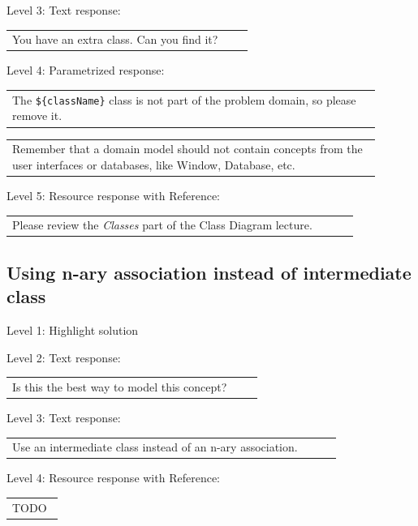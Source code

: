 \noindent Level 3: Text response: \medskip

\begin{tabular}{|p{0.9\linewidth}}
You have an extra class. Can you find it?
\end{tabular} \medskip

\noindent Level 4: Parametrized response: \medskip

\begin{tabular}{|p{0.9\linewidth}}
The \verb|${className}| class is not part of the problem domain, so please remove it.
\end{tabular} \medskip

\begin{tabular}{|p{0.9\linewidth}}
Remember that a domain model should not contain concepts from the user interfaces or databases, like Window, Database, etc.
\end{tabular} \medskip

\noindent Level 5: Resource response with Reference: \medskip

\begin{tabular}{|p{0.9\linewidth}}
Please review the \textit{Classes} part of the Class Diagram lecture.
\end{tabular} \medskip


\subsection{Using n-ary association instead of intermediate class}

\noindent Level 1: Highlight solution  \medskip

\noindent Level 2: Text response: \medskip

\begin{tabular}{|p{0.9\linewidth}}
Is this the best way to model this concept?
\end{tabular} \medskip

\noindent Level 3: Text response: \medskip

\begin{tabular}{|p{0.9\linewidth}}
Use an intermediate class instead of an n-ary association.
\end{tabular} \medskip

\noindent Level 4: Resource response with Reference: \medskip

\begin{tabular}{|p{0.9\linewidth}}
TODO
\end{tabular} \medskip



